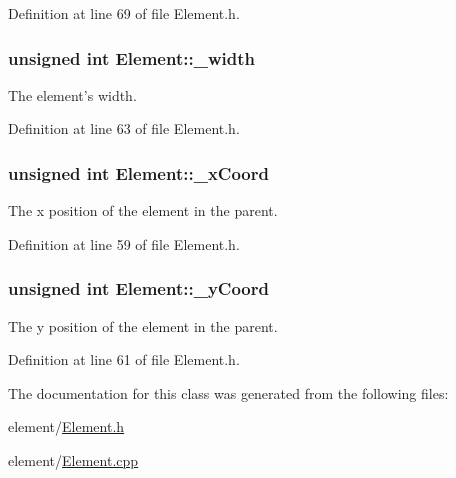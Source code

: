 Definition at line 69 of file Element.\-h.

\hypertarget{class_element_a559a2b7894e65668aee75346a3976f86}{
\subsubsection[{\-\_\-width}]{\setlength{\rightskip}{0pt plus 5cm}unsigned int Element\-::\-\_\-width\hspace{0.3cm}{\ttfamily [protected]}}}\label{class_element_a559a2b7894e65668aee75346a3976f86}
The element's width. 

Definition at line 63 of file Element.\-h.

\hypertarget{class_element_a53e4a4ffd5e4e60ce40f55f910d11f23}{
\subsubsection[{\-\_\-x\-Coord}]{\setlength{\rightskip}{0pt plus 5cm}unsigned int Element\-::\-\_\-x\-Coord\hspace{0.3cm}{\ttfamily [protected]}}}\label{class_element_a53e4a4ffd5e4e60ce40f55f910d11f23}
The x position of the element in the parent. 

Definition at line 59 of file Element.\-h.

\hypertarget{class_element_ab7215197a138c164d0ab07d7632e2ef2}{
\subsubsection[{\-\_\-y\-Coord}]{\setlength{\rightskip}{0pt plus 5cm}unsigned int Element\-::\-\_\-y\-Coord\hspace{0.3cm}{\ttfamily [protected]}}}\label{class_element_ab7215197a138c164d0ab07d7632e2ef2}
The y position of the element in the parent. 

Definition at line 61 of file Element.\-h.



The documentation for this class was generated from the following files\-:\begin{DoxyCompactItemize}
\item 
element/\hyperlink{_element_8h}{Element.\-h}\item 
element/\hyperlink{_element_8cpp}{Element.\-cpp}\end{DoxyCompactItemize}
